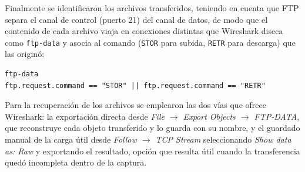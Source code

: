 Finalmente se identificaron los archivos transferidos, teniendo en cuenta que FTP separa el canal de control (puerto 21) del canal de datos, de modo que el contenido de cada archivo viaja en conexiones distintas que Wireshark diseca como \texttt{ftp-data} y asocia al comando (\texttt{STOR} para subida, \texttt{RETR} para descarga) que las originó:

\begin{lstlisting}
ftp-data
ftp.request.command == "STOR" || ftp.request.command == "RETR"
\end{lstlisting}


\begin{analisis}
\end{analisis}

\begin{respuesta}
\end{respuesta}

Para la recuperación de los archivos se emplearon las dos vías que ofrece Wireshark: la exportación directa desde \emph{File $\rightarrow$ Export Objects $\rightarrow$ FTP-DATA}, que reconstruye cada objeto transferido y lo guarda con su nombre, y el guardado manual de la carga útil desde \emph{Follow $\rightarrow$ TCP Stream} seleccionando \emph{Show data as: Raw} y exportando el resultado, opción que resulta útil cuando la transferencia quedó incompleta dentro de la captura.


\begin{analisis}
\end{analisis}


\begin{analisis}
\end{analisis}

\begin{respuesta}
\end{respuesta}
